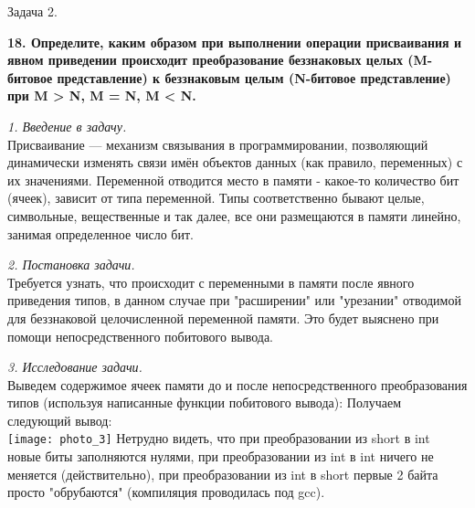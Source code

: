\documentclass{article}
\begin{document}
\begin{section}{Задача 2.}
\begin{center}
    \textbf{18. Определите, каким образом при выполнении операции присваивания и явном приведении происходит преобразование беззнаковых целых (M-битовое представление) к беззнаковым целым (N-битовое представление) при M > N, M = N, M < N.}
\end{center}

{\itshape 1. Введение в задачу.}\\
Присваивание — механизм связывания в программировании, позволяющий динамически изменять связи имён объектов данных (как правило, переменных) с их значениями. Переменной отводится место в памяти - какое-то количество бит (ячеек), зависит от типа переменной. Типы соответственно бывают целые, символьные, вещественные и так далее, все они размещаются в памяти линейно, занимая определенное число бит.

{\itshape 2. Постановка задачи.}\\
Требуется узнать, что происходит с переменными в памяти после явного приведения типов, в данном случае при "расширении" или "урезании" отводимой для беззнаковой целочисленной переменной памяти. Это будет выяснено при помощи непосредственного побитового вывода.

{\itshape 3. Исследование задачи.}\\
Выведем содержимое ячеек памяти до и после непосредственного преобразования типов (используя написанные функции побитового вывода):
Получаем следующий вывод:\\
\texttt{[image: photo\_3]}
Нетрудно видеть, что при преобразовании из short в int новые биты заполняются нулями, при преобразовании из int в int ничего не меняется (действительно), при преобразовании из int в short первые 2 байта просто "обрубаются" (компиляция проводилась под gcc).
\end{section}
\end{document}
